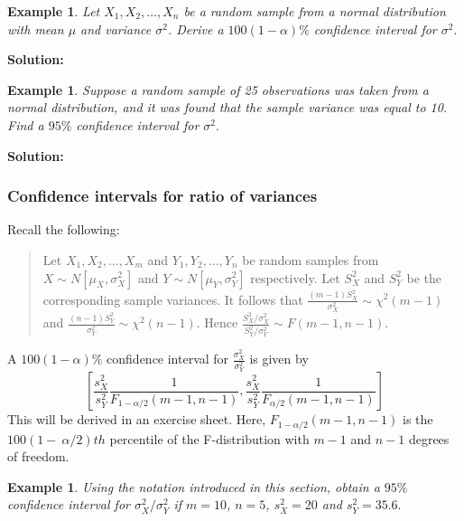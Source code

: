 \documentclass[12pt]{article}
\newtheorem{example}[theorem]{Example}
\begin{document}
\begin{example}
Let $X_{1},X_{2},\ldots,X_{n}$ be a random sample from a normal distribution with mean $\mu$ and variance $\sigma^2$. Derive a $100(1-\alpha)\%$ confidence interval for $\sigma^{2}.$
\end{example}

\begin{mdframed}
{\bf Solution:}
\textcolor[rgb]{1.00,1.00,1.00}{\lipsum[1-3]}
\end{mdframed}

\begin{example}
Suppose a random sample of 25 observations was taken from a normal distribution, and it was found that the sample variance was equal to 10. Find a $95\%$ confidence interval for $\sigma^2.$
\end{example}

\begin{mdframed}
{\bf Solution:}
\textcolor[rgb]{1.00,1.00,1.00}{\lipsum[1-4]}
\end{mdframed}

\subsubsection{Confidence intervals for ratio of variances}
Recall the following:
\begin{quote}
Let $X_{1},X_{2},\ldots,X_{m}$ and $Y_{1},Y_{2},\ldots,Y_{n}$ be  random samples from $X\sim N[\mu_{X},\sigma_{X}^{2}]$ and $Y\sim N[\mu_{Y},\sigma_{Y}^{2}] $ respectively. Let $S_{X}^{2}$ and $S_{Y}^{2}$ be the corresponding sample variances. It follows that $\displaystyle \frac{(m-1)S_{X}^{2}}{\sigma_{X}^{2}} \sim \chi^{2}(m-1)$ and $\displaystyle \frac{(n-1)S_{Y}^{2}}{\sigma_{Y}^{2}} \sim \chi^{2}(n-1).$ Hence $\displaystyle \frac{S_{X}^{2}/\sigma_{X}^{2}}{S_{Y}^{2}/\sigma_{Y}^{2}} \sim F(m-1,n-1).$
\end{quote}

 A $100(1-\alpha)\%$ confidence interval for $\displaystyle \frac{\sigma_{X}^{2}}{\sigma_{Y}^{2}}$ is given by
$$
\left[\frac{s_{X}^{2}}{s_{Y}^{2}}\frac{1}{F_{1-\alpha/2}(m-1,n-1)},\frac{s_{X}^{2}}{s_{Y}^{2}}\frac{1}{F_{\alpha/2}(m-1,n-1)}\right]
$$
This will be derived in an exercise sheet. Here, $F_{1-\alpha/2}(m-1,n-1)$ is the $100(1-~\alpha/2)th$ percentile of the F-distribution with $m-1$ and $n-1$ degrees of freedom.

\begin{example}
Using the notation introduced in this section, obtain a $95\%$ confidence interval for $\sigma_{X}^{2}/\sigma_{Y}^{2}$ if $m=10$, $n=5$, $s_{X}^{2}=20$ and $s_{Y}^{2}=35.6.$
\end{example}
\end{document}
